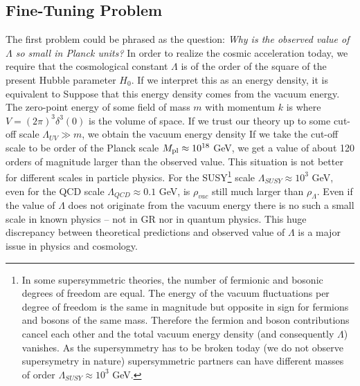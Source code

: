 \subsection{Fine-Tuning Problem}
The first problem could be phrased as the question: \textit{Why is the observed value of $\Lambda$ so small in Planck units?} In order to realize the cosmic acceleration today, we require that the cosmological constant $\Lambda$ is of the order of the square of the present Hubble parameter $H_0$. If we interpret this as an energy density, it is equivalent to
Suppose that this energy density comes from the vacuum energy. The zero-point energy of some field of mass $m$ with momentum $k$ is
where $V=(2\pi)^3\delta^3(0)$ is the volume of space. If we trust our theory up to some cut-off scale $\Lambda_{UV}\gg m$, we obtain the vacuum energy density
If we take the cut-off scale to be order of the Planck scale $M_{\text{\scriptsize pl}}\approx10^{18}$ GeV, we get a value of about 120 orders of magnitude larger than the observed value. This situation is not better for different scales in particle physics. For the SUSY\footnote{In some supersymmetric theories, the number of fermionic and bosonic degrees of freedom are equal. The energy of the vacuum fluctuations per degree of freedom is the same in magnitude but opposite in sign for fermions and bosons of the same mass. Therefore the fermion and boson contributions cancel each other and the total vacuum energy density (and consequently $\Lambda$) vanishes. As the supersymmetry has to be broken today (we do not observe supersymetry in nature) supersymmetric partners can have different masses of order $\Lambda_{SUSY}\approx10^{3}$ GeV.} scale $\Lambda_{SUSY}\approx10^{3}$ GeV, even for the QCD scale $\Lambda_{QCD}\approx0.1$ GeV, is $\rho_{vac}$ still much larger than $\rho_\Lambda$. Even if the value of $\Lambda$ does not originate from the vacuum energy there is no such a small scale in known physics -- not in GR nor in quantum physics. This huge discrepancy between theoretical predictions and observed value of $\Lambda$ is a major issue in physics and cosmology.
